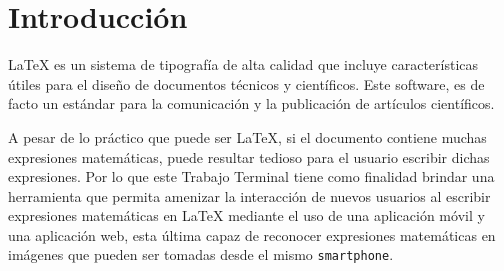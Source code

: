 \chapter{Introducción}




LaTeX es un sistema de tipografía de alta calidad que incluye características útiles para el diseño de documentos técnicos y científicos. Este software, es de facto un estándar para la comunicación y la publicación de artículos científicos. %
\bigskip

A pesar de lo práctico que puede ser LaTeX, si el documento contiene muchas expresiones matemáticas, puede resultar tedioso para el usuario escribir dichas expresiones. Por lo que este Trabajo Terminal tiene como finalidad brindar una herramienta que permita amenizar la interacción de nuevos usuarios al escribir expresiones matemáticas en LaTeX mediante el uso de una aplicación móvil y una aplicación web, esta última capaz de reconocer expresiones matemáticas en imágenes que pueden ser tomadas desde el mismo \texttt{smartphone}.
\bigskip


